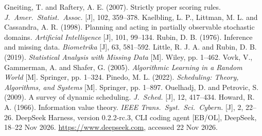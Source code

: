 \documentclass{swmcmthesis}
\begin{document}
\enlargethispage{4\baselineskip}
\footnotesize
\begin{thebibliography}{\slotBibWidth}

\setlength{\itemsep}{-1.0pt}\setlength{\parsep}{0pt}\setlength{\parskip}{0pt}
\scriptsize
\setlength{\itemsep}{-1.0pt}\setlength{\parskip}{0pt}
 Gneiting, T. and Raftery, A. E. (2007). Strictly proper
scoring rules. \emph{J.\ Amer.\ Statist.\ Assoc.} [J], 102, 359--378.
 Kaelbling, L. P., Littman, M. L. and Cassandra, A. R.
(1998). Planning and acting in partially observable stochastic domains.
\emph{Artificial Intelligence} [J], 101, 99--134.
 Rubin, D. B. (1976). Inference and missing data.
\emph{Biometrika} [J], 63, 581--592.
 Little, R. J. A. and Rubin, D. B. (2019). \emph{Statistical
Analysis with Missing Data} [M]. Wiley, pp. 1--462.
 Vovk, V., Gammerman, A. and Shafer, G. (2005). \emph{Algorithmic
Learning in a Random World} [M]. Springer, pp. 1--324.
 Pinedo, M. L. (2022). \emph{Scheduling: Theory, Algorithms,
and Systems} [M]. Springer, pp. 1--897.
 Ouelhadj, D. and Petrovic, S. (2009). A survey of dynamic
scheduling. \emph{J.\ Sched.} [J], 12, 417--434.
 Howard, R. A. (1966). Information value theory. \emph{IEEE Trans.\ Syst.\ Sci.\ Cybern.} [J], 2, 22--26.
 DeepSeek Harness, version 0.2.2-rc.3, CLI coding agent [EB/OL], DeepSeek, 18--22 Nov 2026. \url{https://www.deepseek.com}, accessed 22 Nov 2026.
\end{thebibliography}
\normalsize

\label{BodyLastPage}
\clearpage
\end{document}
